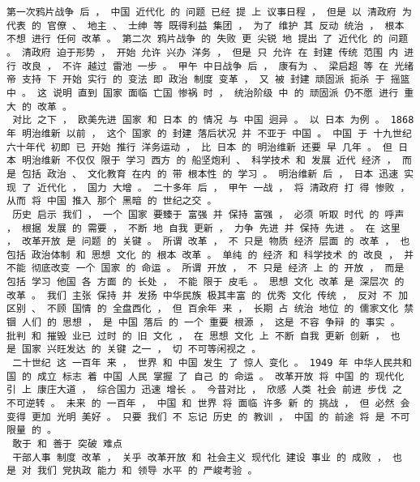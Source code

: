 \documentclass{article}
\begin{document}
\begin{Verbatim}[commandchars=\\\{\}]
 第一次鸦片战争 后 ， 中国 近代化 的 问题 已经 提 上 议事日程 ， 但是 以 清政府 为 代表 的 官僚 、 地主 、 士绅 等 既得利益 集团 ， 为了 维护 其 反动 统治 ， 根本 不想 进行 任何 改革 。 第二次 鸦片战争 的 失败 更 尖锐 地 提出 了 近代化 的 问题 。 清政府 迫于形势 ， 开始 允许 兴办 洋务 ， 但是 只 允许 在 封建 传统 范围 内 进行 改良 ， 不许 越过 雷池 一步 。 甲午 中日战争 后 ， 康有为 、 梁启超 等 在 光绪帝 支持 下 开始 实行 的 变法 即 政治 制度 变革 ， 又 被 封建 顽固派 扼杀 于 摇篮 中 。 这 说明 直到 国家 面临 亡国 惨祸 时 ， 统治阶级 中 的 顽固派 仍不愿 进行 重大 的 改革 。 
 对比 之下 ， 欧美先进 国家 和 日本 的 情况 与 中国 迥异 。 以 日本 为例 。 1868 年 明治维新 以前 ， 这个 国家 的 封建 落后状况 并 不亚于 中国 。 中国 于 十九世纪 六十年代 初即 已 开始 推行 洋务运动 ， 比 日本 的 明治维新 还要 早 几年 。 但 日本 明治维新 不仅仅 限于 学习 西方 的 船坚炮利 、 科学技术 和 发展 近代 经济 ， 而是 包括 政治 、 文化教育 在内 的 带 根本性 的 学习 。 明治维新 后 ， 日本 迅速 实现 了 近代化 ， 国力 大增 。 二十多年 后 ， 甲午 一战 ， 将 清政府 打 得 惨败 ， 从而 将 中国 推入 那个 黑暗 的 世纪之交 。 
 历史 启示 我们 ， 一个 国家 要臻于 富强 并 保持 富强 ， 必须 听取 时代 的 呼声 ， 根据 发展 的 需要 ， 不断 地 自我 更新 ， 力争 先进 并 保持 先进 。 在 这里 ， 改革开放 是 问题 的 关键 。 所谓 改革 ， 不 只是 物质 经济 层面 的 改革 ， 也 包括 政治体制 和 思想 文化 的 根本 改革 。 单纯 的 经济 和 科学技术 的 改良 ， 并 不能 彻底改变 一个 国家 的 命运 。 所谓 开放 ， 不 只是 经济 上 的 开放 ， 而是 包括 学习 他国 各 方面 的 长处 ， 不能 限于 皮毛 。 思想 文化 改革 是 深层次 的 改革 。 我们 主张 保持 并 发扬 中华民族 极其丰富 的 优秀 文化 传统 ， 反对 不 加 区别 、 不顾 国情 的 全盘西化 ， 但 百余年 来 ， 长期 占 统治 地位 的 儒家文化 禁锢 人们 的 思想 ， 是 中国 落后 的 一个 重要 根源 ， 这是 不容 争辩 的 事实 。 批判 和 摧毁 业已 过时 的 旧 文化 ， 在 思想 文化 上 不断 自我 更新 创新 ， 也 是 国家 兴旺发达 的 关键 之一 ， 切 不可等闲视之 。 
 二十世纪 这 一百年 来 ， 世界 和 中国 发生 了 惊人 变化 。 1949 年 中华人民共和国 的 成立 标志 着 中国 人民 掌握 了 自己 的 命运 。 改革开放 将 中国 的 现代化 引 上 康庄大道 ， 综合国力 迅速 增长 。 今昔对比 ， 欣感 人类 社会 前进 步伐 之 不可逆转 。 未来 的 一百年 ， 中国 和 世界 将 面临 许多 新 的 挑战 ， 但 必然 会 变得 更加 光明 美好 。 只要 我们 不 忘记 历史 的 教训 ， 中国 的 前途 将 是 不可限量 的 。 
 敢于 和 善于 突破 难点 
 干部人事 制度 改革 ， 关乎 改革开放 和 社会主义 现代化 建设 事业 的 成败 ， 也 是 对 我们 党执政 能力 和 领导 水平 的 严峻考验 。 

\end{Verbatim}
\end{document}
